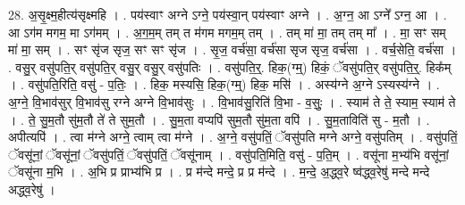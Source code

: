 \documentclass[17pt]{extarticle}
\begin{document}
28. अ॒सृ॒क्ष्म॒हीत्य॑सृक्ष्महि । . पय॑स्वाꣳ अग्ने ऽग्ने॒ पय॑स्वा॒न् पय॑स्वाꣳ अग्ने । . अ॒ग्न॒ आ ऽग्ने᳚ ऽग्न॒ आ । . आ ऽग॑म मगम॒ मा ऽग॑मम् । . अ॒ग॒म॒म् तम् त म॑गम मगम॒म् तम् । . तम् मा॑ मा॒ तम् तम् मा᳚ । . मा॒ सꣳ सम् मा॑ मा॒ सम् । . सꣳ सृ॑ज सृज॒ सꣳ सꣳ सृ॑ज । . सृ॒ज॒ वर्च॑सा॒ वर्च॑सा सृज सृज॒ वर्च॑सा । . वर्च॒सेति॒ वर्च॑सा । . वसु॒र् वसु॑पति॒र् वसु॑पति॒र् वसु॒र् वसु॒र् वसु॑पतिः । . वसु॑पति॒र्॒. हिक॒(ग्म्॒) हिकं॒ ॅवसु॑पति॒र् वसु॑पति॒र्॒. हिक᳚म् । . वसु॑पति॒रिति॒ वसु॑ - प॒तिः॒ । . हिक॒ मस्यसि॒ हिक॒(ग्म्॒) हिक॒ मसि॑ । . अस्य॑ग्ने अ॒ग्ने ऽस्यस्य॑ग्ने । . अ॒ग्ने॒ वि॒भाव॑सुर् वि॒भाव॑सु रग्ने अग्ने वि॒भाव॑सुः । . वि॒भाव॑सु॒रिति॑ वि॒भा - व॒सुः॒ । . स्याम॑ ते ते॒ स्याम॒ स्याम॑ ते । . ते॒ सु॒म॒तौ सु॑म॒तौ ते॑ ते सुम॒तौ । . सु॒म॒ता वप्यपि॑ सुम॒तौ सु॑म॒ता वपि॑ । . सु॒म॒ताविति॑ सु - म॒तौ । . अपीत्यपि॑ । . त्वा म॑ग्ने अग्ने॒ त्वाम् त्वा म॑ग्ने । . अ॒ग्ने॒ वसु॑पतिं॒ ॅवसु॑पति मग्ने अग्ने॒ वसु॑पतिम् । . वसु॑पतिं॒ ॅवसू॑नां॒ ॅवसू॑नां॒ ॅवसु॑पतिं॒ ॅवसु॑पतिं॒ ॅवसू॑नाम् । . वसु॑पति॒मिति॒ वसु॑ - प॒ति॒म् । . वसू॑ना म॒भ्य॑भि वसू॑नां॒ ॅवसू॑ना म॒भि । . अ॒भि प्र प्राभ्य॑भि प्र । . प्र म॑न्दे मन्दे॒ प्र प्र म॑न्दे । . म॒न्दे॒ अ॒द्ध्व॒रे ष्व॑द्ध्व॒रेषु॑ मन्दे मन्दे अद्ध्व॒रेषु॑ । \newline
\end{document}
